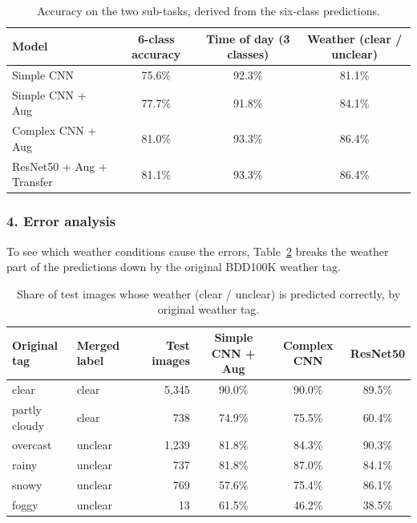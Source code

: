 \documentclass[12pt,letterpaper]{article}
\begin{document}
\begin{table}[htbp]
\centering\small
\caption{Accuracy on the two sub-tasks, derived from the six-class predictions.}
\label{tab:subtasks}
\begin{tabular}{lccc}
\toprule
Model & 6-class accuracy & Time of day (3 classes) & Weather (clear / unclear) \\
\midrule
Simple CNN                & 75.6\% & 92.3\% & 81.1\% \\
Simple CNN + Aug          & 77.7\% & 91.8\% & 84.1\% \\
Complex CNN + Aug         & 81.0\% & 93.3\% & 86.4\% \\
ResNet50 + Aug + Transfer & 81.1\% & 93.3\% & 86.4\% \\
\bottomrule
\end{tabular}
\end{table}

\subsubsection{4. Error analysis}
To see which weather conditions cause the errors, Table~\ref{tab:tags} breaks the weather part of the predictions down
by the original BDD100K weather tag.

\begin{table}[htbp]
\centering\small
\caption{Share of test images whose weather (clear / unclear) is predicted correctly, by original weather tag.}
\label{tab:tags}
\begin{tabular}{llrccc}
\toprule
Original tag & Merged label & Test images & Simple CNN + Aug & Complex CNN & ResNet50 \\
\midrule
clear         & clear   & 5{,}345 & 90.0\% & 90.0\% & 89.5\% \\
partly cloudy & clear   & 738     & 74.9\% & 75.5\% & 60.4\% \\
overcast      & unclear & 1{,}239 & 81.8\% & 84.3\% & 90.3\% \\
rainy         & unclear & 737     & 81.8\% & 87.0\% & 84.1\% \\
snowy         & unclear & 769     & 57.6\% & 75.4\% & 86.1\% \\
foggy         & unclear & 13      & 61.5\% & 46.2\% & 38.5\% \\
\bottomrule
\end{tabular}
\end{table}
\end{document}
